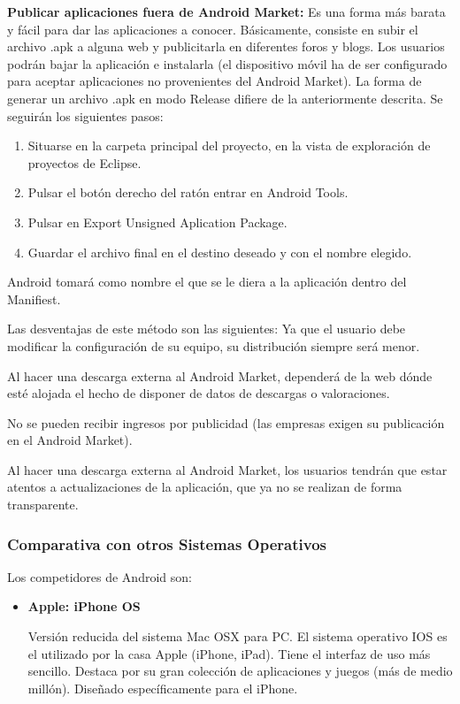 \documentclass[12 pt, a4paper, twoside]{article}
\begin{document}
\textbf{Publicar aplicaciones fuera de Android Market:}
Es una forma más barata y fácil para dar las aplicaciones a conocer. Básicamente,
consiste en subir el archivo .apk a alguna web y publicitarla en diferentes
foros y blogs. Los usuarios podrán bajar la aplicación e instalarla (el dispositivo
móvil ha de ser configurado para aceptar aplicaciones no provenientes del Android
Market).
La forma de generar un archivo .apk en modo Release difiere de la anteriormente
descrita. Se seguirán los siguientes pasos:
\begin{enumerate}
\item Situarse en la carpeta principal del proyecto, en la vista de exploración de
proyectos de Eclipse.
\item Pulsar el botón derecho del ratón entrar en Android Tools.
\item Pulsar en Export Unsigned Aplication Package.
\item Guardar el archivo final en el destino deseado y con el nombre elegido.
\end{enumerate}

Android tomará como nombre el que se le diera a la aplicación dentro del
Manifiest.

Las desventajas de este método son las siguientes:
Ya que el usuario debe modificar la configuración de su equipo, su distribución
siempre será menor.

Al hacer una descarga externa al Android Market, dependerá de la web dónde
esté alojada el hecho de disponer de datos de descargas o valoraciones.

No se pueden recibir ingresos por publicidad (las empresas exigen su publicación
en el Android Market).

Al hacer una descarga externa al Android Market, los usuarios tendrán que
estar atentos a actualizaciones de la aplicación, que ya no se realizan de
forma transparente.

\subsubsection{Comparativa con otros Sistemas Operativos}
Los competidores de Android son:
\begin{itemize}
\item \textbf{Apple: iPhone OS}

Versión reducida del sistema Mac OSX para PC. El sistema operativo IOS
es el utilizado por la casa Apple (iPhone, iPad). Tiene el interfaz de
uso más sencillo. Destaca por su gran colección de aplicaciones y
juegos (más de medio millón). Diseñado específicamente para el
iPhone.
\end{itemize}
\end{document}
